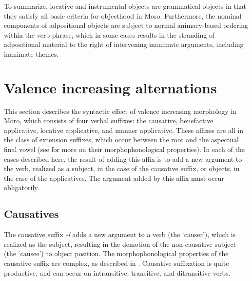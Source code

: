 To summarize, locative and instrumental objects are grammatical objects in that they satisfy all basic criteria for objecthood in Moro. Furthermore, the nominal components of adpositional objects are subject to normal animacy-based ordering within the verb phrase, which in some cases results in the stranding of adpositional material to the right of intervening inanimate arguments, including inanimate themes.

\section{Valence increasing alternations}\label{sec:ch12:increasing}

This section describes the syntactic effect of valence increasing morphology in Moro, which consists of four verbal suffixes: the causative, benefactive applicative, locative applicative, and manner applicative. These affixes are all in the class of extension suffixes, which occur between the root and the aspectual final vowel  (see  for more on their morphophonological properties).  In each of the cases described here, the result of adding this affix is to add a new argument to the verb, realized as a subject, in the case of the causative suffix, or objects, in the case of the applicatives. The argument added by this affix must occur obligatorily.

\subsection{Causatives}\label{sec:ch12:causative}

The causative suffix \textit{-\'i} adds a new argument to a verb (the `causer'), which is realized as the subject, resulting in the demotion of the non-causative subject (the `causee') to object position. The morphophonological properties of the causative suffix are complex, as described in . Causative suffixation is quite productive, and can occur on intransitive, transitive, and ditransitive verbs.

